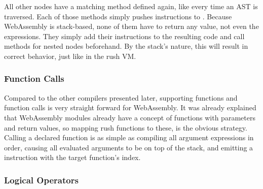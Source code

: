 All other nodes have a matching method defined again, like every time an AST is traversed.
Each of those methods simply pushes instructions to .
Because WebAssembly is stack-based, none of them have to return any value, not even the expressions.
They simply add their instructions to the resulting code and call methods for nested nodes beforehand.
By the stack's nature, this will result in correct behavior, just like in the rush VM.

\subsubsection{Function Calls}

Compared to the other compilers presented later, supporting functions and function calls is very straight forward for WebAssembly.
It was already explained that WebAssembly modules already have a concept of functions with parameters and return values, so mapping rush functions to these, is the obvious strategy.
Calling a declared function is as simple as compiling all argument expressions in order, causing all evaluated arguments to be on top of the stack, and emitting a  instruction with the target function's index.

\subsubsection{Logical Operators}


